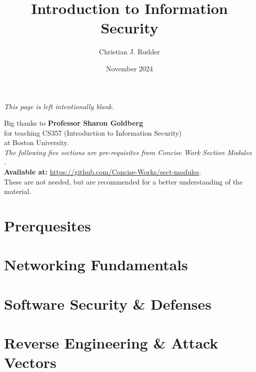 \documentclass{memoir}
\title{Introduction to Information Security}
\author{Christian J. Rudder}
\date{November 2024}
\begin{document}
\maketitle
\setcounter{tocdepth}{2}

\tableofcontents

\newpage
\thispagestyle{empty}
\mbox{}
\vfill
\begin{center}
    \textit{This page is left intentionally blank.}
\end{center}
\vfill
\newpage
\thispagestyle{empty}
\mbox{}
\vfill
\begin{center}
    \Large{Big thanks to \textbf{Professor Sharon Goldberg}}\\
    \normalsize 
    for teaching CS357 (Introduction to Information Security)\\
    at Boston University.\\

    \vspace{2em}
    \textit{The following five sections are pre-requisites from Concise Work Section Modules \cite{concise_works_modules}.}\\
    \textbf{Available at:} \url{https://github.com/Concise-Works/sect-modules}.\\
    These are not needed, but are recommended for a better understanding of the material.\\
    
    
\end{center}
\vfill

\chapter{Prerquesites}

% 




\chapter{Networking Fundamentals}


\chapter{Software Security \& Defenses}


\noindent



\chapter{Reverse Engineering \& Attack Vectors}



\end{document}
